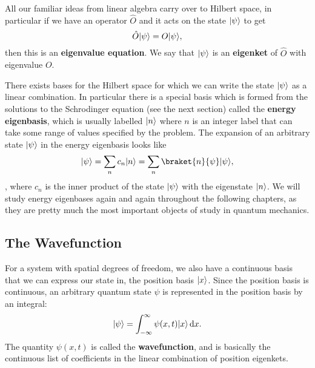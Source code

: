 \documentclass[../quantum_mechanics.tex]{subfiles}
\begin{document}
            All our familiar ideas from linear algebra carry over to Hilbert space, in particular if we have an operator $\hat{O}$ and it acts on the state $\lvert\psi\rangle$ to get
            \begin{equation}
                \hat{O}\lvert\psi\rangle=O\lvert\psi\rangle,
            \end{equation}
            then this is an \textbf{eigenvalue equation}.
            We say that $\lvert\psi\rangle$ is an \textbf{eigenket} of $\hat{O}$ with eigenvalue $O$.

            There exists bases for the Hilbert space for which we can write the state $\lvert\psi\rangle$ as a linear combination.
            In particular there is a special basis which is formed from the solutions to the Schrodinger equation (see the next section) called the \textbf{energy eigenbasis}, which is usually labelled $\lvert n\rangle$ where $n$ is an integer label that can take some range of values specified by the problem.
            The expansion of an arbitrary state $\lvert\psi\rangle$ in the energy eigenbasis looks like
            \begin{equation}\label{eq:braket-superposition}
                \ket{\psi}=\sum_n c_n\ket{n}=\sum_n\braket{n}{\psi}\ket{\psi},
            \end{equation},
            where $c_n$ is the inner product of the state $\lvert\psi\rangle$ with the eigenstate $\lvert n\rangle$.
            We will study energy eigenbases again and again throughout the following chapters, as they are pretty much the most important objects of study in quantum mechanics.

        \subsection{The Wavefunction}\label{sec:quantum-states:subsec:the-wavefunction}
            For a system with spatial degrees of freedom, we also have a continuous basis that we can express our state in, the position basis $\lvert x\rangle$.
            Since the position basis is continuous, an arbitrary quantum state $\psi$ is represented in the position basis by an integral:
            \begin{equation}
                \ket{\psi}=\int_{-\infty}^\infty\psi(x,t)\ket{x}\dd{x}.
            \end{equation}
            The quantity $\psi(x,t)$ is called the \textbf{wavefunction}, and is basically the continuous list of coefficients in the linear combination of position eigenkets.
\end{document}
